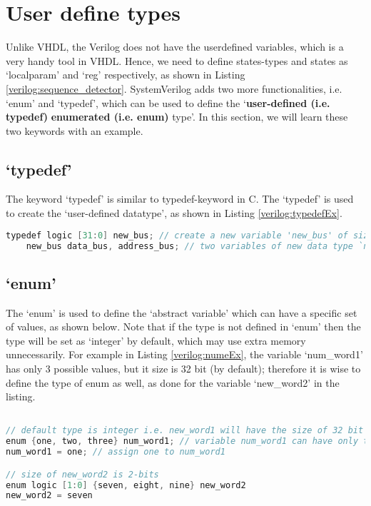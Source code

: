 


\section{User define types} 
Unlike VHDL, the Verilog does not have the userdefined variables, which is a very handy tool in VHDL. Hence, we need to define states-types and states as `localparam' and `reg' respectively, as shown in Listing \ref{verilog:sequence_detector}. SystemVerilog adds two more functionalities, i.e. `enum' and `typedef', which can be used to define the `\textbf{user-defined (i.e. typedef)} \textbf{enumerated (i.e. enum)} type'. In this section, we will learn these two keywords with an example. 

\subsection{`typedef'} 
The keyword `typedef' is similar to typedef-keyword in C. The `typedef' is used to create the `user-defined datatype', as shown in Listing \ref{verilog:typedefEx}. 

\begin{lstlisting}[language=Verilog, caption={`typedef' example}, label={verilog:typedefEx}]
	typedef logic [31:0] new_bus; // create a new variable 'new_bus' of size 32
	new_bus data_bus, address_bus; // two variables of new data type `new_bus'
\end{lstlisting}

\subsection{`enum'}
The `enum' is used to define the `abstract variable' which can have a specific set of values, as shown below. Note that if the type is not defined in `enum' then the type will be set as `integer' by default, which may use extra memory unnecessarily. For example in Listing \ref{verilog:numeEx}, the variable `num\_word1' has only 3 possible values, but it size is 32 bit (by default); therefore it is wise to define the type of enum as well, as done for the variable `new\_word2' in the listing. 
\begin{lstlisting}[language=Verilog, caption={`enum' example}, label={verilog:numeEx}]

// default type is integer i.e. new_word1 will have the size of 32 bit
enum {one, two, three} num_word1; // variable num_word1 can have only three types of values
num_word1 = one; // assign one to num_word1

// size of new_word2 is 2-bits
enum logic [1:0] {seven, eight, nine} new_word2
new_word2 = seven
\end{lstlisting}

